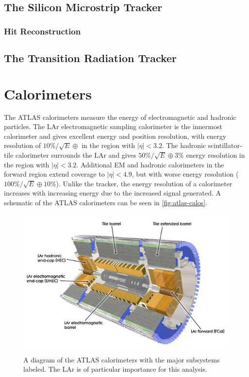 \subsection{The Silicon Microstrip Tracker}
\subsubsection{Hit Reconstruction}
\subsection{The Transition Radiation Tracker}


\section{Calorimeters}

The \ac{ATLAS} calorimeters measure the energy of electromagnetic and hadronic particles. The \ac{LAr} electromagnetic sampling calorimeter is the innermost calorimeter and gives excellent energy and position resolution, with energy resolution of $10\%/\sqrt{E} \oplus $ in the region with $|\eta| < 3.2$. The hadronic scintillator-tile calorimeter surrounds the \ac{LAr} and gives $50\%/\sqrt{E} \oplus 3\%$ energy resolution in the region with $|\eta| < 3.2$. Additional \ac{EM} and hadronic calorimeters in the forward region extend coverage to $|\eta| < 4.9$, but with worse energy resolution ($100\%/\sqrt{E} \oplus 10\%$). Unlike the tracker, the energy resolution of a calorimeter increases with increasing energy due to the increased signal generated. A schematic of the \ac{ATLAS} calorimeters can be seen in \autoref{fig:atlas-calos}. 


\begin{figure}[htbp]
\centering
\includegraphics[width=.8\textwidth]{figures/Detector/atlas-calorimeters.jpg}
\caption{A diagram of the \ac{ATLAS} calorimeters with the major subsystems labeled. The \ac{LAr} is of particular importance for this analysis.}
\label{fig:atlas-calos}
\end{figure}


